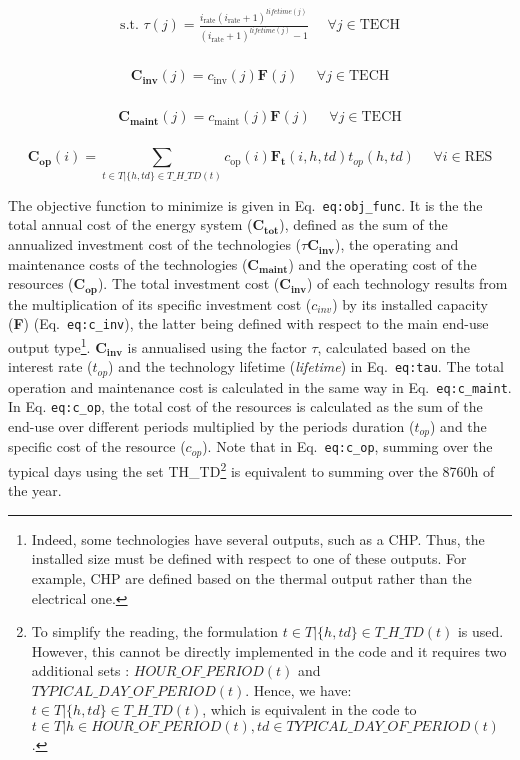 \documentclass[
]{article}
\begin{document}
{\[\begin{aligned}
\text{s.t. }  \textbf{$\tau$}(j) =  \frac{i_{\text{rate}}(i_{\text{rate}}+1)^{lifetime(j)}}{(i_{\text{rate}}+1)^{lifetime(j)} - 1} ~~~~~~ \forall j \in \text{TECH}\\
\end{aligned}\]}

{\[\begin{aligned}
\textbf{C}_{\textbf{inv}}(j) = c_{\text{inv}}(j) \textbf{F}(j) ~~~~~~ \forall j \in \text{TECH}\\
\end{aligned}\]}

{\[\begin{aligned}
\textbf{C}_{\textbf{maint}}(j) = c_{\text{maint}}(j) \textbf{F}(j) ~~~~~~ \forall j \in \text{TECH}\\
\end{aligned}\]}

{\[\textbf{C}_{\textbf{op}}(i) = \sum_{t \in T | \{h,td\} \in T\_H\_TD(t)} c_{\text{op}}(i) \textbf{F}_{\textbf{t}}(i,h,td) t_{op} (h,td)  
~~~~~~ \forall i \in \text{RES}\]}

The objective function to minimize is given in
Eq.~\texttt{eq:obj\_func}. It is the the total annual cost of the energy
system (\(\textbf{C}_{\textbf{tot}}\)), defined as the sum of the
annualized investment cost of the technologies
(\(\tau\textbf{C}_{\textbf{inv}}\)), the operating and maintenance costs
of the technologies (\(\textbf{C}_{\textbf{maint}}\)) and the operating
cost of the resources (\(\textbf{C}_{\textbf{op}}\)). The total
investment cost (\(\textbf{C}_{\textbf{inv}}\)) of each technology
results from the multiplication of its specific investment cost
(\(c_{inv}\)) by its installed capacity (\textbf{F})
(Eq.~\texttt{eq:c\_inv}), the latter being defined with respect to the
main end-use output type\footnote{Indeed, some technologies have several
  outputs, such as a CHP. Thus, the installed size must be defined with
  respect to one of these outputs. For example, CHP are defined based on
  the thermal output rather than the electrical one.}.
\(\textbf{C}_{\textbf{inv}}\) is annualised using the factor \(\tau\),
calculated based on the interest rate (\(t_{op}\)) and the technology
lifetime (\emph{lifetime}) in Eq.~\texttt{eq:tau}. The total operation
and maintenance cost is calculated in the same way in
Eq.~\texttt{eq:c\_maint}. In Eq. \texttt{eq:c\_op}, the total cost of
the resources is calculated as the sum of the end-use over different
periods multiplied by the periods\textquotesingle{} duration
(\(t_{op}\)) and the specific cost of the resource (\(c_{op}\)). Note
that in Eq.~\texttt{eq:c\_op}, summing over the typical days using the
set T\label{h_td}{H\_TD}\footnote{To simplify the
  reading, the formulation \(t \in T| \{h,td\} \in T\_H\_TD(t)\) is
  used. However, this cannot be directly implemented in the code and it
  requires two additional sets : \(HOUR\_OF\_PERIOD(t)\) and
  \(TYPICAL\_DAY\_OF\_PERIOD(t)\). Hence, we have:
  \(t \in T| \{h,td\} \in T\_H\_TD(t)\), which is equivalent in the code
  to
  \(t \in T| h \in HOUR\_OF\_PERIOD(t), td \in TYPICAL\_DAY\_OF\_PERIOD(t)\).}
is equivalent to summing over the 8760h of the year.
\end{document}
